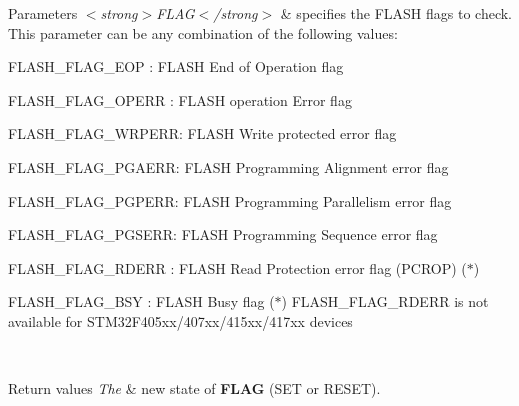 \begin{DoxyParams}{Parameters}
{\em $<$strong$>$\+F\+L\+A\+G$<$/strong$>$} & specifies the F\+L\+A\+SH flags to check. This parameter can be any combination of the following values\+: \begin{DoxyItemize}
\item F\+L\+A\+S\+H\+\_\+\+F\+L\+A\+G\+\_\+\+E\+OP \+: F\+L\+A\+SH End of Operation flag \item F\+L\+A\+S\+H\+\_\+\+F\+L\+A\+G\+\_\+\+O\+P\+E\+RR \+: F\+L\+A\+SH operation Error flag \item F\+L\+A\+S\+H\+\_\+\+F\+L\+A\+G\+\_\+\+W\+R\+P\+E\+RR\+: F\+L\+A\+SH Write protected error flag \item F\+L\+A\+S\+H\+\_\+\+F\+L\+A\+G\+\_\+\+P\+G\+A\+E\+RR\+: F\+L\+A\+SH Programming Alignment error flag \item F\+L\+A\+S\+H\+\_\+\+F\+L\+A\+G\+\_\+\+P\+G\+P\+E\+RR\+: F\+L\+A\+SH Programming Parallelism error flag \item F\+L\+A\+S\+H\+\_\+\+F\+L\+A\+G\+\_\+\+P\+G\+S\+E\+RR\+: F\+L\+A\+SH Programming Sequence error flag \item F\+L\+A\+S\+H\+\_\+\+F\+L\+A\+G\+\_\+\+R\+D\+E\+RR \+: F\+L\+A\+SH Read Protection error flag (P\+C\+R\+OP) ($\ast$) \item F\+L\+A\+S\+H\+\_\+\+F\+L\+A\+G\+\_\+\+B\+SY \+: F\+L\+A\+SH Busy flag ($\ast$) F\+L\+A\+S\+H\+\_\+\+F\+L\+A\+G\+\_\+\+R\+D\+E\+RR is not available for S\+T\+M32\+F405xx/407xx/415xx/417xx devices \end{DoxyItemize}
\\
\hline
\end{DoxyParams}

\begin{DoxyRetVals}{Return values}
{\em The} & new state of {\bfseries F\+L\+AG} (S\+ET or R\+E\+S\+ET). \\
\hline
\end{DoxyRetVals}
\mbox{\label{group___f_l_a_s_h___exported___macros_gaa537e44d74ce35ff5bfef80edf03f895}} 
